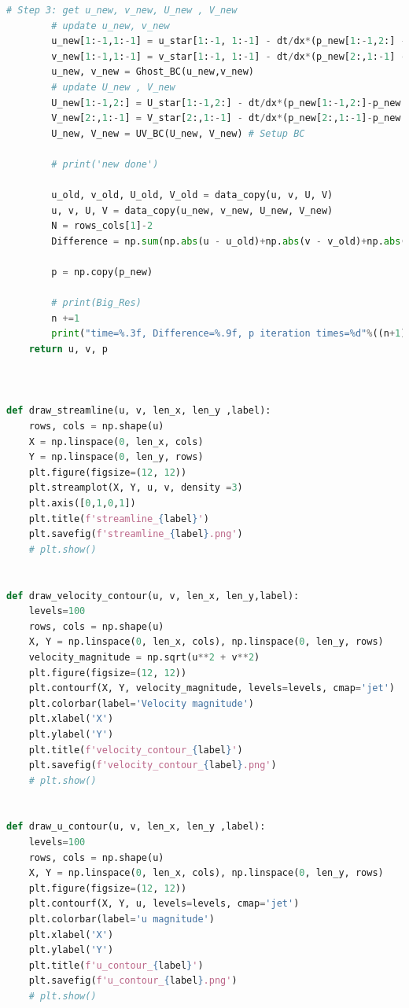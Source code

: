\documentclass[12pt]{article}
\begin{document}
\begin{scriptsize}
\begin{lstlisting}[language=python,caption={Lid Driven Cavity Solver}]
        # Step 3: get u_new, v_new, U_new , V_new
        # update u_new, v_new
        u_new[1:-1,1:-1] = u_star[1:-1, 1:-1] - dt/dx*(p_new[1:-1,2:] - p_new[1:-1,:-2])/2 
        v_new[1:-1,1:-1] = v_star[1:-1, 1:-1] - dt/dx*(p_new[2:,1:-1] - p_new[:-2,1:-1])/2 
        u_new, v_new = Ghost_BC(u_new,v_new)
        # update U_new , V_new
        U_new[1:-1,2:] = U_star[1:-1,2:] - dt/dx*(p_new[1:-1,2:]-p_new[1:-1,1:-1])
        V_new[2:,1:-1] = V_star[2:,1:-1] - dt/dx*(p_new[2:,1:-1]-p_new[1:-1,1:-1])
        U_new, V_new = UV_BC(U_new, V_new) # Setup BC

        # print('new done')

        u_old, v_old, U_old, V_old = data_copy(u, v, U, V)
        u, v, U, V = data_copy(u_new, v_new, U_new, V_new)
        N = rows_cols[1]-2
        Difference = np.sum(np.abs(u - u_old)+np.abs(v - v_old)+np.abs(p_new - p))/N**2

        p = np.copy(p_new)

        # print(Big_Res)
        n +=1
        print("time=%.3f, Difference=%.9f, p iteration times=%d"%((n+1)*dt,Difference,k))
    return u, v, p



def draw_streamline(u, v, len_x, len_y ,label):
    rows, cols = np.shape(u)  
    X = np.linspace(0, len_x, cols)
    Y = np.linspace(0, len_y, rows)
    plt.figure(figsize=(12, 12))
    plt.streamplot(X, Y, u, v, density =3)
    plt.axis([0,1,0,1])
    plt.title(f'streamline_{label}')
    plt.savefig(f'streamline_{label}.png')
    # plt.show()


def draw_velocity_contour(u, v, len_x, len_y,label):
    levels=100 
    rows, cols = np.shape(u)
    X, Y = np.linspace(0, len_x, cols), np.linspace(0, len_y, rows)
    velocity_magnitude = np.sqrt(u**2 + v**2)
    plt.figure(figsize=(12, 12))
    plt.contourf(X, Y, velocity_magnitude, levels=levels, cmap='jet')
    plt.colorbar(label='Velocity magnitude')
    plt.xlabel('X')
    plt.ylabel('Y')
    plt.title(f'velocity_contour_{label}')
    plt.savefig(f'velocity_contour_{label}.png')
    # plt.show()


def draw_u_contour(u, v, len_x, len_y ,label):
    levels=100
    rows, cols = np.shape(u)
    X, Y = np.linspace(0, len_x, cols), np.linspace(0, len_y, rows)
    plt.figure(figsize=(12, 12))
    plt.contourf(X, Y, u, levels=levels, cmap='jet')
    plt.colorbar(label='u magnitude')
    plt.xlabel('X')
    plt.ylabel('Y')
    plt.title(f'u_contour_{label}')
    plt.savefig(f'u_contour_{label}.png')
    # plt.show()




\end{lstlisting}
\end{scriptsize}
\end{document}
